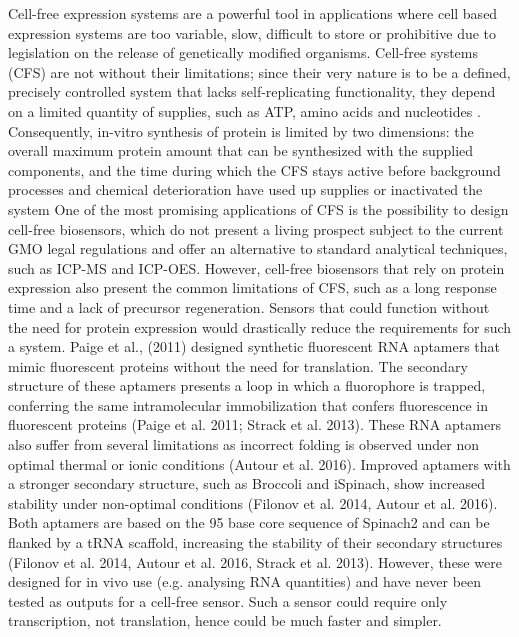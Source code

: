 Cell-free expression systems are a powerful tool in applications where cell based expression systems are
too variable, slow, difficult to store or prohibitive due to legislation on the release of genetically modified
organisms. Cell-free systems (CFS) are not without their limitations; since their very nature is to be a defined,
precisely controlled system that lacks self-replicating functionality, they depend on a limited quantity of
supplies, such as ATP, amino acids and nucleotides \cite{kwon2015high}. Consequently, in-vitro
synthesis of protein is limited by two dimensions: the overall maximum protein amount that can be
synthesized with the supplied components, and the time during which the CFS stays active before
background processes and chemical deterioration have used up supplies or inactivated the system \cite{carlson2012cell,bernhard2013cell,kwon2015high} 
One of the most promising applications of CFS is the possibility to design cell-free biosensors, which do not
present a living prospect subject to the current GMO legal regulations and offer an alternative to standard
analytical techniques, such as ICP-MS and ICP-OES. However, cell-free biosensors that rely on protein
expression also present the
common limitations of CFS, such as a long response time and a lack of
precursor regeneration. Sensors that could function without the need for protein expression would drastically
reduce the requirements for such a system. Paige et al., (2011) designed synthetic fluorescent RNA
aptamers that mimic fluorescent proteins without the need for translation. The secondary structure of these
aptamers presents a loop in which a fluorophore is trapped, conferring the same intramolecular
immobilization that confers fluorescence in fluorescent proteins (Paige et al. 2011; Strack et al. 2013).
These RNA aptamers also suffer from several limitations as incorrect folding is observed under non optimal
thermal or ionic conditions (Autour et al. 2016). Improved aptamers with a stronger secondary structure,
such as Broccoli and iSpinach, show increased stability under non-optimal conditions (Filonov et al. 2014,
Autour et al. 2016). Both aptamers are based on the 95 base core sequence of Spinach2 and can be flanked
by a tRNA scaffold, increasing the stability of their secondary structures (Filonov et al. 2014, Autour et al.
2016, Strack et al. 2013). However, these were designed for in vivo use (e.g. analysing RNA quantities) and
have never been tested as outputs for a cell-free sensor. Such a sensor could require only transcription, not
translation, hence could be much faster and simpler.
